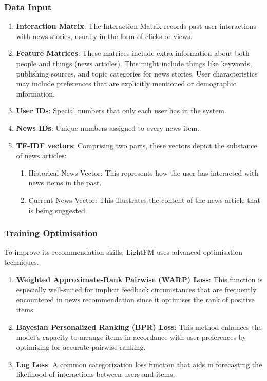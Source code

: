 \documentclass[9pt,twocolumn,twoside,lineno]{gsajnl}
\begin{document}
\subsubsection{Data Input}
\begin{enumerate}
\item \textbf{Interaction Matrix}: The Interaction Matrix records past user interactions with news stories, usually in the form of clicks or views.
\item \textbf{Feature Matrices}: These matrices include extra information about both people and things (news articles).  This might include things like keywords, publishing sources, and topic categories for news stories.  User characteristics may include preferences that are explicitly mentioned or demographic information.
\item \textbf{User IDs}: Special numbers that only each user has in the system.
\item \textbf{News IDs}: Unique numbers assigned to every news item.
\item \textbf{TF-IDF vectors}: Comprising two parts, these vectors depict the substance of news articles:
    \begin{enumerate}
    \item Historical News Vector: This represents how the user has interacted with news items in the past.
    \item Current News Vector: This illustrates the content of the news article that is being suggested.
    \end{enumerate}
\end{enumerate}

\subsubsection{Training Optimisation\newline}
To improve its recommendation skills, LightFM uses advanced optimisation techniques.
\begin{enumerate}
\item \textbf{Weighted Approximate-Rank Pairwise (WARP) Loss}: This function is especially well-suited for implicit feedback circumstances that are frequently encountered in news recommendation since it optimises the rank of positive items.
\item \textbf{Bayesian Personalized Ranking (BPR) Loss}: This method enhances the model's capacity to arrange items in accordance with user preferences by optimizing for accurate pairwise ranking.
\item \textbf{Log Loss}: A common categorization loss function that aids in forecasting the likelihood of interactions between users and items.
\end{enumerate}
\end{document}
